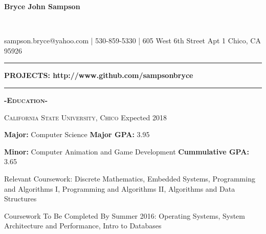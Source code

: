 \documentclass[12pt]{article}
\begin{document}
\center
\begin{Huge}\textbf{Bryce John Sampson}\end{Huge}\\
\medskip
\fontsize{12}{1.2}
\selectfont

\noindent
sampson.bryce@yahoo.com | 530-859-5330 | 605 West 6th Street Apt 1 Chico, CA 95926

\noindent\rule{16.5cm}{0.4pt}
\begin{center}
\begin{Large}
\textbf{PROJECTS: \color{TealBlue}http://www.github.com/sampsonbryce}
\end{Large}
\end{center}

\noindent\rule{16.5cm}{0.4pt}
\smallskip
\center
\textbf{\textsc{-Education-}}\\
\flushleft
\begin{footnotesize}
\textsc{California State University, Chico}
\hfill
\color{gray}Expected 2018\\
\color{black}
\bigskip

\color{Cerulean}\textbf{Major: }\color{black}Computer Science
\hfill
\color{Cerulean}\textbf{Major GPA: }\color{black}3.95\\
\smallskip

\color{Cerulean}\textbf{Minor: }\color{black}Computer Animation and Game Development
\hfill
\color{Cerulean}\textbf{Cummulative GPA: }\color{black}3.65\\
\bigskip

\color{Cerulean}Relevant Coursework: \color{black} Discrete Mathematics, Embedded Systems,
Programming and Algorithms I, Programming and Algorithms II, Algorithms and Data Structures
\smallskip

\color{Cerulean}Coursework To Be Completed By Summer 2016: \color{black}Operating Systems, System Architecture and Performance, Intro to Databases
\end{footnotesize}

\bigskip
\end{document}

